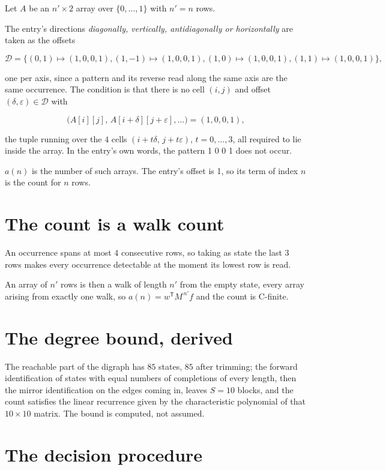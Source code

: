 \documentclass[11pt]{article}
\theoremstyle{definition}
\begin{document}
Let $A$ be an $n' \times 2$ array over $\{0,\dots,1\}$ with $n' = n$ rows.

The entry's directions {\itshape diagonally, vertically, antidiagonally or horizontally} are taken as the offsets

\[\mathcal{D} = \{(0,1)\mapsto(1,0,0,1), (1,-1)\mapsto(1,0,0,1), (1,0)\mapsto(1,0,0,1), (1,1)\mapsto(1,0,0,1)\},\]

one per axis, since a pattern and its reverse read along the same axis are the same occurrence. The condition is that there is no cell $(i,j)$ and offset $(\delta,\varepsilon)\in\mathcal{D}$ with

\[\bigl(A[i][j],\,A[i{+}\delta][j{+}\varepsilon],\dots\bigr) = (1, 0, 0, 1),\]

the tuple running over the $4$ cells $(i+t\delta,\,j+t\varepsilon)$, $t = 0,\dots,3$, all required to lie inside the array. In the entry's own words, the pattern 1 0 0 1 does not occur.

$a(n)$ is the number of such arrays. The entry's offset is 1, so its term of index $n$ is the count for $n$ rows.

\section{The count is a walk count}

An occurrence spans at most $4$ consecutive rows, so taking as state the last $3$ rows makes every occurrence detectable at the moment its lowest row is read.

An array of $n'$ rows is then a walk of length $n'$ from the empty state, every array arising from exactly one walk, so $a(n) = w^{\mathsf T}M^{\,n'}f$ and the count is C-finite.

\section{The degree bound, derived}

The reachable part of the digraph has $85$ states, $85$ after trimming; the forward identification of states with equal numbers of completions of every length, then the mirror identification on the edges coming in, leaves $S = 10$ blocks, and the count satisfies the linear recurrence given by the characteristic polynomial of that $10\times10$ matrix. The bound is computed, not assumed.

\section{The decision procedure}
\end{document}
